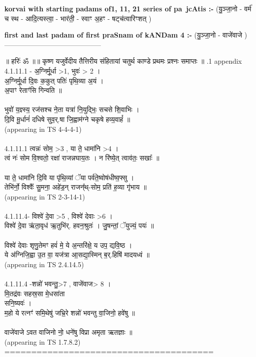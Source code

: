 \documentclass[17pt]{extarticle}
\begin{document}
\textbf{korvai with starting padams of1, 11, 21 series of pa~jcAtis :-} \newline
(यु॒ञ्जा॒नो - वर्म॑ च स्थ - आदि॒त्यस्त्वा॒ - भार॑ती॒ - स्वाꣳ अ॒हꣳ - षट्च॑त्वारिꣳशत् ) \newline

\textbf{first and last padam of first praSnam of kANDam 4 :-} \newline
(यु॒ञ्जा॒नो - वाजे॑वाजे )
------------------------------------------ \newline 


॥ हरिः॑ ॐ ॥॥ कृष्ण यजुर्वेदीय तैत्तिरीय संहितायां चतुर्थ काण्डे प्रथमः प्रश्नः समाप्तः ॥ \newline
{}.1   appendix\\4.1.11.1 - अ॒ग्निर्मू॒र्धा >1, भुवः॑ > 2 । \\अ॒ग्निर्मू॒र्धा दि॒वः क॒कुत् पतिः॑ पृथि॒व्या अ॒यं ।\\अ॒पाꣳ रेताꣳ॑सि गिन्वति ॥\\\\भुवो॑ य॒ज्ञ्स्य॒ रज॑सश्च ने॒ता यत्रा॑ नि॒युद्भिः॒ सचसे शि॒वाभिः ।\\दि॒वि मू॒र्धानं॑ दधिषे सुव॒र्.षा जि॒ह्वाम॑ग्ने चकृषे हव्य॒वाहं᳚ ॥\\(appearing in TS 4-4-4-1)\\\\4.1.11.1 त्वन्नः॑ सोम॒ >3 , या ते॒ धामा॑नि >4 । \\त्वं नः॑ सोम वि॒श्वतो॒ रक्षा॑ राजन्नघाय॒तः । न रि॑ष्ये॒त् त्वाव॑तः॒ सखाः᳚ ॥\\\\या ते॒ धामा॑नि दि॒वि या पृ॑थि॒व्यां ॅया पर्व॑ते॒ष्वोष॑धीष्व॒फ्सु । \\तेभि॑र्नो॒ विश्वैः᳚ सु॒मना॒ अहे॑ड॒न् राजन्᳚थ्-सोम॒ प्रति॑ ह॒व्या गृ॑भाय ॥\\(appearing in TS 2-3-14-1)\\\\4.1.11.4- विश्वे॑ दे॒वा >5 , विश्वे॑ देवाः >6 । \\विश्वे॑ दे॒वा ऋ॑ता॒वृध॑ ऋ॒तुभि॑र्. हवन॒श्रुतः॑ । जु॒षन्तां॒ ॅयुज्यं॒ पयः॑ ॥\\\\विश्वे॑ देवाः शृणु॒तेमꣳ हवं॑ मे॒ ये अ॒न्तरि॑क्षे॒ य उप॒ द्यवि॒ष्ठ । \\ये अ॑ग्निजि॒ह्वा उ॒त वा॒ यज॑त्रा आ॒सद्या॒स्मिन् ब॒र्.हिषि॑ मादयध्वं ॥ \\(appearing in TS 2.4.14.5)\\\\4.1.11.4 -शन्नो॑ भवन्तु॒>7 , वाजे॑वाज> 8 । \\मि॒तद्र॑वः सहस्र॒सा मे॒धसा॑ता \\सनि॒ष्यवः॑ । \\म॒हो ये रत्नꣳ॑ समि॒थेषु॑ जभ्रि॒रे शन्नो॑ भवन्तु वा॒जिनो॒ हवे॑षु ॥\\\\वाजे॑वाजे ऽवत वाजिनो नो॒ धने॑षु विप्रा अमृता ऋतज्ञाः ॥\\(appearing in TS 1.7.8.2)\\=======================================\\
\pagebreak
        
\end{document}
